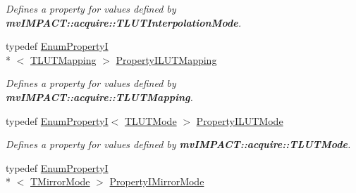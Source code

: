 \begin{DoxyCompactItemize}
\begin{DoxyCompactList}\small\item\em Defines a property for values defined by {\bfseries mv\+I\+M\+P\+A\+C\+T\+::acquire\+::\+T\+L\+U\+T\+Interpolation\+Mode}. \end{DoxyCompactList}\item 
\hypertarget{group___common_interface_ga2641eda4be7328bd1e2af06cc136fb4b}{typedef \hyperlink{classmv_i_m_p_a_c_t_1_1acquire_1_1_enum_property_i}{Enum\+Property\+I}\\*
$<$ \hyperlink{group___common_interface_ga161dbf21975385f4cd6bd555fd39298c}{T\+L\+U\+T\+Mapping} $>$ \hyperlink{group___common_interface_ga2641eda4be7328bd1e2af06cc136fb4b}{Property\+I\+L\+U\+T\+Mapping}}\label{group___common_interface_ga2641eda4be7328bd1e2af06cc136fb4b}

\begin{DoxyCompactList}\small\item\em Defines a property for values defined by {\bfseries mv\+I\+M\+P\+A\+C\+T\+::acquire\+::\+T\+L\+U\+T\+Mapping}. \end{DoxyCompactList}\item 
\hypertarget{group___common_interface_ga64e784bb1c97e3a3eed6ff572935e5d2}{typedef \hyperlink{classmv_i_m_p_a_c_t_1_1acquire_1_1_enum_property_i}{Enum\+Property\+I}$<$ \hyperlink{group___common_interface_ga622d4fe4aa7b262752e9101c78f87f57}{T\+L\+U\+T\+Mode} $>$ \hyperlink{group___common_interface_ga64e784bb1c97e3a3eed6ff572935e5d2}{Property\+I\+L\+U\+T\+Mode}}\label{group___common_interface_ga64e784bb1c97e3a3eed6ff572935e5d2}

\begin{DoxyCompactList}\small\item\em Defines a property for values defined by {\bfseries mv\+I\+M\+P\+A\+C\+T\+::acquire\+::\+T\+L\+U\+T\+Mode}. \end{DoxyCompactList}\item 
\hypertarget{group___common_interface_ga6adf15b90e84144e36bdfa8e26fb38de}{typedef \hyperlink{classmv_i_m_p_a_c_t_1_1acquire_1_1_enum_property_i}{Enum\+Property\+I}\\*
$<$ \hyperlink{group___common_interface_ga3b84e6791167cb1e9b91a6318816979e}{T\+Mirror\+Mode} $>$ \hyperlink{group___common_interface_ga6adf15b90e84144e36bdfa8e26fb38de}{Property\+I\+Mirror\+Mode}}\label{group___common_interface_ga6adf15b90e84144e36bdfa8e26fb38de}


\end{DoxyCompactItemize}
